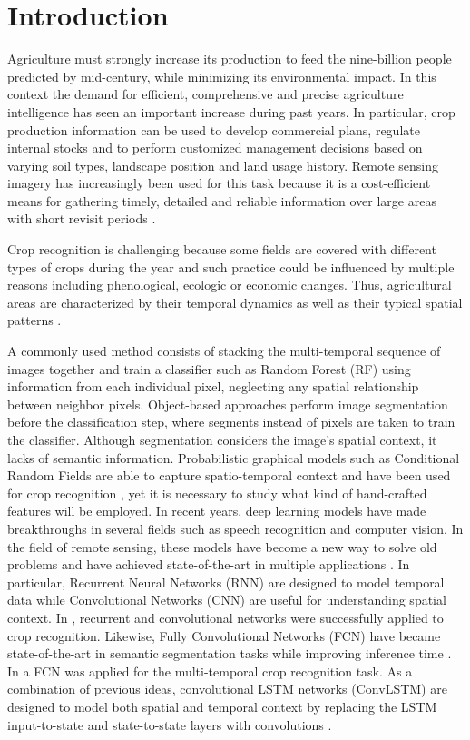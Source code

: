 
\section{Introduction}

Agriculture must strongly increase its production to feed the nine-billion people predicted by mid-century, while minimizing its environmental impact. In this context the demand for efficient, comprehensive and precise agriculture intelligence has seen an important increase during past years. In particular, crop production information can be used to develop commercial plans, regulate internal stocks and to perform customized management decisions based on varying soil types, landscape position and land usage history. Remote sensing imagery has increasingly been used for this task because it is a cost-efficient means for gathering timely, detailed and reliable information over large areas with short revisit periods \cite{thenkabail2015land,leite2011hidden}.

Crop recognition is challenging because some fields are covered with different types of crops during the year and such practice could be influenced by multiple reasons including phenological, ecologic or economic changes. Thus, agricultural areas are characterized by their temporal dynamics as well as their typical spatial patterns \cite{lohmann2008multi,waske2009classifier}. 

A commonly used method consists of stacking the multi-temporal sequence of images together and train a classifier such as Random Forest (RF) using information from each individual pixel, neglecting any spatial relationship between neighbor pixels. Object-based approaches perform image segmentation before the classification step, where segments instead of pixels are taken to train the classifier. Although segmentation considers the image's spatial context, it lacks of semantic information. Probabilistic graphical models such as Conditional Random Fields are able to capture spatio-temporal context and have been used for crop recognition \cite{achanccaray2017spatial}, yet it is necessary to study what kind of hand-crafted features will be employed. 
In recent years, deep learning models have made breakthroughs in several fields such as speech recognition and computer vision. In the field of remote sensing, these models have become a new way to solve old problems and have achieved state-of-the-art in multiple applications \cite{audebertdeep}. In particular, Recurrent Neural Networks (RNN) are designed to model temporal data while Convolutional Networks (CNN) are useful for understanding spatial context. In \cite{rnnjose}, recurrent and convolutional networks were successfully applied to crop recognition. Likewise, Fully Convolutional Networks (FCN) have became state-of-the-art in semantic segmentation tasks while improving inference time \cite{long2015fully}. In \cite{fcnlaura} a FCN was applied for the multi-temporal crop recognition task. As a combination of previous ideas, convolutional LSTM networks (ConvLSTM) are designed to model both spatial and temporal context by replacing the LSTM input-to-state and state-to-state layers with convolutions \cite{xingjian2015convolutional}. 

